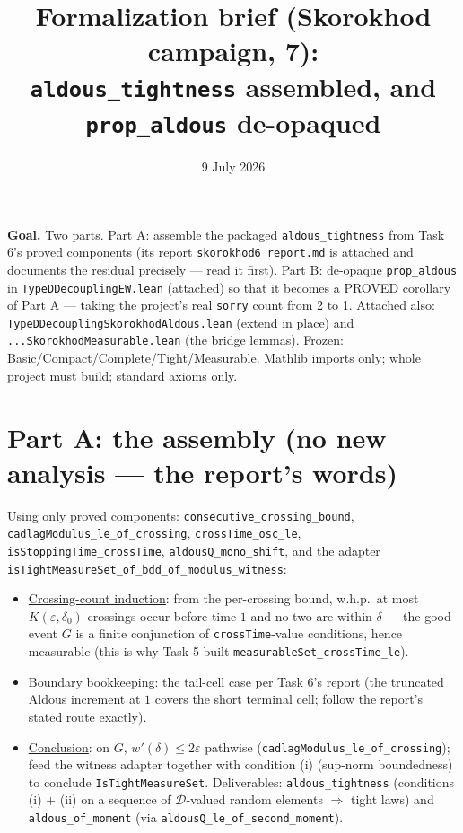 \documentclass[11pt]{article}
\title{Formalization brief (Skorokhod campaign, 7):\\
\texttt{aldous\_tightness} assembled, and \texttt{prop\_aldous} de-opaqued}
\date{9 July 2026}
\theoremstyle{plain}
\theoremstyle{remark}
\newcommand{\D}{\mathcal D}\newcommand{\eps}{\varepsilon}
\begin{document}
\maketitle

\noindent\textbf{Goal.} Two parts. Part A: assemble the packaged
\texttt{aldous\_tightness} from Task 6's proved components (its report
\texttt{skorokhod6\_report.md} is attached and documents the residual
precisely --- read it first). Part B: de-opaque \texttt{prop\_aldous} in
\texttt{TypeDDecouplingEW.lean} (attached) so that it becomes a PROVED
corollary of Part A --- taking the project's real \texttt{sorry} count from
2 to 1. Attached also: \texttt{TypeDDecouplingSkorokhodAldous.lean} (extend
in place) and \texttt{...SkorokhodMeasurable.lean} (the bridge lemmas).
Frozen: Basic/Compact/Complete/Tight/Measurable. Mathlib imports only; whole
project must build; standard axioms only.

\section*{Part A: the assembly (no new analysis --- the report's words)}

Using only proved components: \texttt{consecutive\_crossing\_bound},
\texttt{cadlagModulus\_le\_of\_crossing},
\texttt{crossTime\_osc\_le}, \texttt{isStoppingTime\_crossTime},
\texttt{aldousQ\_mono\_shift}, and the adapter
\texttt{isTightMeasureSet\_of\_bdd\_of\_modulus\_witness}:
\begin{itemize}
\item[(a)] \underline{Crossing-count induction}: from the per-crossing bound,
w.h.p.\ at most $K(\eps,\delta_0)$ crossings occur before time $1$ and no
two are within $\delta$ --- the good event $G$ is a finite conjunction of
\texttt{crossTime}-value conditions, hence measurable (this is why Task 5
built \texttt{measurableSet\_crossTime\_le}).
\item[(b)] \underline{Boundary bookkeeping}: the tail-cell case per Task 6's
report (the truncated Aldous increment at $1$ covers the short terminal
cell; follow the report's stated route exactly).
\item[(c)] \underline{Conclusion}: on $G$, $w'(\delta)\le2\eps$ pathwise
(\texttt{cadlagModulus\_le\_of\_crossing}); feed the witness adapter together
with condition (i) (sup-norm boundedness) to conclude
\texttt{IsTightMeasureSet}. Deliverables: \texttt{aldous\_tightness}
(conditions (i) $+$ (ii) on a sequence of $\D$-valued random elements
$\Rightarrow$ tight laws) and \texttt{aldous\_of\_moment} (via
\texttt{aldousQ\_le\_of\_second\_moment}).
\end{itemize}
\end{document}

